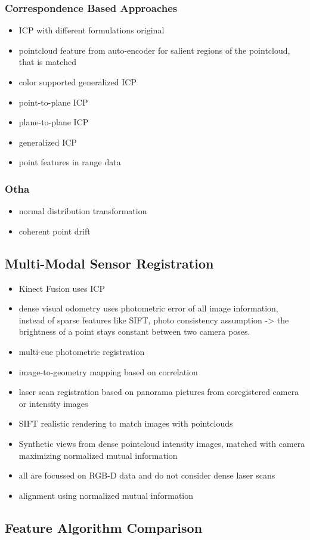 \subsubsection{Correspondence Based Approaches}

\begin{itemize}
    \item ICP with different formulations original\cite{besl_pami1992}
    \item pointcloud feature from auto-encoder for salient regions of the pointcloud, that is matched\cite{elbaz_cvpr2017}
    \item color supported generalized ICP\cite{korn_2014}
    \item point-to-plane ICP
    \item plane-to-plane ICP
    \item generalized ICP\cite{segal_2009}
    \item point features in range data\cite{steder_robot2010}
\end{itemize}

\subsubsection{Otha}
\begin{itemize}
    \item normal distribution transformation\cite{biber_iros2003}
    \item coherent point drift\cite{myronenko_ieee2010}
\end{itemize}

\subsection{Multi-Modal Sensor Registration}

\begin{itemize}
    \item Kinect Fusion uses ICP\cite{newcombe_ismar2011}
    \item dense visual odometry uses photometric error of all image information, instead of sparse features like SIFT\cite{kerl_icra2013}, photo consistency assumption -> the brightness of a point stays constant between two camera poses.
    \item multi-cue photometric registration\cite{corte_icra2018}
    \item image-to-geometry mapping based on correlation\cite{corsini_cgf2009}
    \item laser scan registration based on panorama pictures from coregistered camera or intensity images\cite{alba_isprs2012}
    \item SIFT realistic rendering to match images with pointclouds\cite{sibbing_3dv2013}
    \item Synthetic views from dense pointcloud intensity images, matched with camera maximizing normalized mutual information\cite{wolcott_iros2014,zhao_icra2016}
    \item all are focussed on RGB-D data and do not consider dense laser scans
    \item alignment using normalized mutual information
\end{itemize}

\subsection{Feature Algorithm Comparison}
